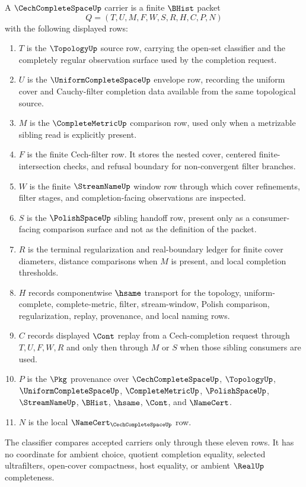 \begin{definition}\label{def:cech-complete-space-carrier}
A $\CechCompleteSpaceUp$ carrier is a finite $\BHist$ packet
$$
Q=(T,U,M,F,W,S,R,H,C,P,N)
$$
with the following displayed rows:
\begin{enumerate}
\item $T$ is the $\TopologyUp$ source row, carrying the open-set classifier and the completely regular observation surface used by the completion request.
\item $U$ is the $\UniformCompleteSpaceUp$ envelope row, recording the uniform cover and Cauchy-filter completion data available from the same topological source.
\item $M$ is the $\CompleteMetricUp$ comparison row, used only when a metrizable sibling read is explicitly present.
\item $F$ is the finite Cech-filter row. It stores the nested cover, centered finite-intersection checks, and refusal boundary for non-convergent filter branches.
\item $W$ is the finite $\StreamNameUp$ window row through which cover refinements, filter stages, and completion-facing observations are inspected.
\item $S$ is the $\PolishSpaceUp$ sibling handoff row, present only as a consumer-facing comparison surface and not as the definition of the packet.
\item $R$ is the terminal regularization and real-boundary ledger for finite cover diameters, distance comparisons when $M$ is present, and local completion thresholds.
\item $H$ records componentwise $\hsame$ transport for the topology, uniform-complete, complete-metric, filter, stream-window, Polish comparison, regularization, replay, provenance, and local naming rows.
\item $C$ records displayed $\Cont$ replay from a Cech-completion request through $T,U,F,W,R$ and only then through $M$ or $S$ when those sibling consumers are used.
\item $P$ is the $\Pkg$ provenance over $\CechCompleteSpaceUp$, $\TopologyUp$, $\UniformCompleteSpaceUp$, $\CompleteMetricUp$, $\PolishSpaceUp$, $\StreamNameUp$, $\BHist$, $\hsame$, $\Cont$, and $\NameCert$.
\item $N$ is the local $\NameCert_{\CechCompleteSpaceUp}$ row.
\end{enumerate}
The classifier compares accepted carriers only through these eleven rows. It has no coordinate for ambient choice, quotient completion equality, selected ultrafilters, open-cover compactness, host equality, or ambient $\RealUp$ completeness.
\end{definition}

